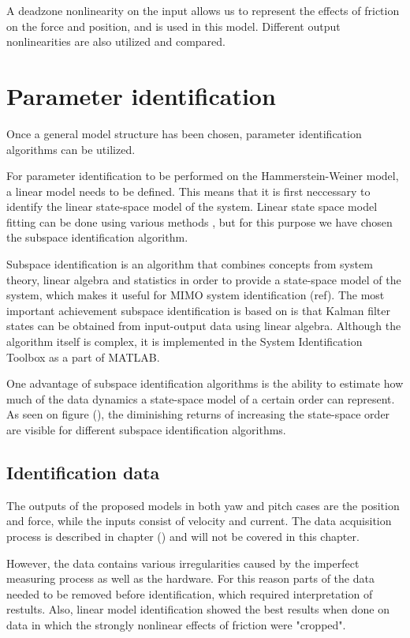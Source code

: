 A deadzone nonlinearity on the input allows us to represent the effects of friction on the force and position, and is used in this model.
Different output nonlinearities are also utilized and compared.

\section{Parameter identification}
Once a general model structure has been chosen, parameter identification algorithms can be utilized.

For parameter identification to be performed on the Hammerstein-Weiner model, a linear model needs to be defined.
This means that it is first neccessary to identify the linear state-space model of the system.
Linear state space model fitting can be done using various methods , but for this purpose we have chosen the subspace identification algorithm.

Subspace identification is an algorithm that combines concepts from system theory, linear algebra and statistics in order to provide a state-space model of the system, which makes it useful for MIMO system identification (ref). 
The most important achievement subspace identification is based on is that Kalman filter states can be obtained from input-output data using linear algebra.
Although the algorithm itself is complex, it is implemented in the System Identification Toolbox as a part of MATLAB.

One advantage of subspace identification algorithms is the ability to estimate how much of the data dynamics a state-space model of a certain order can represent. 
As seen on figure (), the diminishing returns of increasing the state-space order are visible for different subspace identification algorithms.


\subsection{Identification data}
The outputs of the proposed models in both yaw and pitch cases are the position and force, while the inputs consist of velocity and current.
The data acquisition process is described in chapter () and will not be covered in this chapter.

However, the data contains various irregularities caused by the imperfect measuring process as well as the hardware.
For this reason parts of the data needed to be removed before identification, which required interpretation of restults.
Also, linear model identification showed the best results when done on data in which the strongly nonlinear effects of friction were "cropped".

